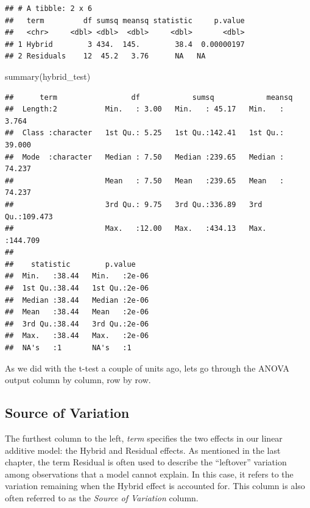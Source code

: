 \documentclass[
]{book}
\newenvironment{Shaded}{\begin{snugshade}}{\end{snugshade}}
\newcommand{\FunctionTok}[1]{\textcolor[rgb]{0.00,0.00,0.00}{#1}}
\newcommand{\NormalTok}[1]{#1}
\begin{document}
\begin{verbatim}
## # A tibble: 2 x 6
##   term         df sumsq meansq statistic     p.value
##   <chr>     <dbl> <dbl>  <dbl>     <dbl>       <dbl>
## 1 Hybrid        3 434.  145.        38.4  0.00000197
## 2 Residuals    12  45.2   3.76      NA   NA
\end{verbatim}

\begin{Shaded}
\begin{Highlighting}[]
\FunctionTok{summary}\NormalTok{(hybrid\_test)}
\end{Highlighting}
\end{Shaded}

\begin{verbatim}
##      term                 df            sumsq            meansq       
##  Length:2           Min.   : 3.00   Min.   : 45.17   Min.   :  3.764  
##  Class :character   1st Qu.: 5.25   1st Qu.:142.41   1st Qu.: 39.000  
##  Mode  :character   Median : 7.50   Median :239.65   Median : 74.237  
##                     Mean   : 7.50   Mean   :239.65   Mean   : 74.237  
##                     3rd Qu.: 9.75   3rd Qu.:336.89   3rd Qu.:109.473  
##                     Max.   :12.00   Max.   :434.13   Max.   :144.709  
##                                                                       
##    statistic        p.value     
##  Min.   :38.44   Min.   :2e-06  
##  1st Qu.:38.44   1st Qu.:2e-06  
##  Median :38.44   Median :2e-06  
##  Mean   :38.44   Mean   :2e-06  
##  3rd Qu.:38.44   3rd Qu.:2e-06  
##  Max.   :38.44   Max.   :2e-06  
##  NA's   :1       NA's   :1
\end{verbatim}

As we did with the t-test a couple of units ago, lets go through the ANOVA output column by column, row by row.

\hypertarget{source-of-variation}{%
\subsection{Source of Variation}\label{source-of-variation}}

The furthest column to the left, \emph{term} specifies the two effects in our linear additive model: the Hybrid and Residual effects. As mentioned in the last chapter, the term Residual is often used to describe the ``leftover'' variation among observations that a model cannot explain. In this case, it refers to the variation remaining when the Hybrid effect is accounted for. This column is also often referred to as the \emph{Source of Variation} column.
\end{document}

